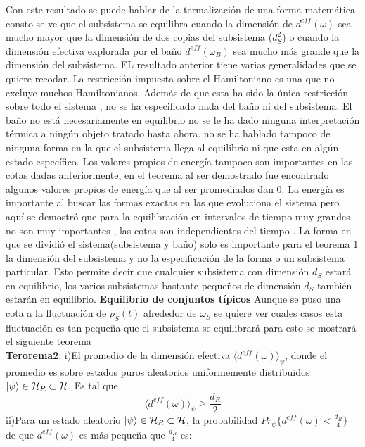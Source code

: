 Con este resultado se puede hablar de la termalización de una forma matemática consto se ve que el subsistema se equilibra cuando la dimensión de $d^{eff}(\omega)$ sea mucho mayor que la dimensión de dos copias del subsistema ($d_{S}^{2}$) o cuando la dimensión efectiva explorada por el baño $d^{eff}(\omega_{B})$ sea mucho más grande que la dimensión del subsistema.
EL resultado anterior tiene varias generalidades que se quiere recodar. La restricción impuesta sobre el Hamiltoniano  es una que no excluye muchos Hamiltonianos. Además de que esta ha sido la única restricción sobre todo el sistema , no se ha especificado nada del baño ni del subsistema. El baño no está necesariamente en equilibrio no se le ha dado ninguna interpretación térmica a ningún objeto tratado hasta ahora. no se ha hablado tampoco de ninguna forma en la que el subsistema llega al equilibrio ni que esta en algún estado específico.
Los valores propios de energía tampoco son importantes en las cotas dadas anteriormente, en el teorema al ser demostrado fue encontrado algunos valores propios de energía que al ser promediados dan 0. La energía es importante al buscar las formas exactas en las que evoluciona el sistema pero aquí se demostró que para la equilibración en intervalos de tiempo muy grandes no son muy importantes , las cotas son independientes del tiempo . La forma en que se dividió el sistema(subsistema y baño) solo es importante para el teorema 1 la dimensión del subsistema y no la especificación de la forma o un subsistema particular. Esto permite decir que cualquier subsistema con dimensión $d_{S}$ estará en equilibrio, los varios subsistemas bastante pequeños de dimensión $d_{S}$ también estarán en equilibrio.
\textbf{Equilibrio de conjuntos típicos}
Aunque se puso una cota a la fluctuación de $\rho_{S}(t)$ alrededor de $\omega_{S}$ se quiere ver cuales casos esta fluctuación es tan pequeña que el subsistema se equilibrará para esto se mostrará el siguiente teorema\\
\textbf{Terorema2}:
i)El promedio de la dimensión efectiva $\langle d^{eff}(\omega) \rangle_{\psi}$, donde el promedio es sobre estados puros aleatorios uniformemente distribuidos $\ket{\psi} \in \mathcal{H}_{R} \subset \mathcal{H}$. Es tal que 
\begin{equation}
\langle d^{eff}(\omega) \rangle_{\psi} \ge \frac{d_{R}}{2}
\end{equation}
ii)Para un estado aleatorio $\ket{\psi} \in \mathcal{H}_{R} \subset \mathcal{H}$, la probabilidad $Pr_{\psi} \{ d^{eff}(\omega) < \frac{d_{R}}{4}  \}$ de que $d^{eff}(\omega)$ es más pequeña que $\frac{d_{R}}{4}$ es:
